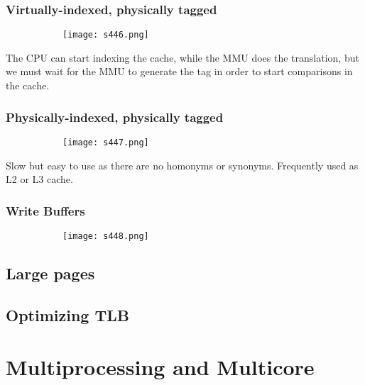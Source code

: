 \documentclass[8pt]{extreport}
\begin{document}
\subsection{Virtually-indexed, physically tagged}

\begin{figure}[H]
\begin{subfigure}[b]{0.4\linewidth}
\texttt{[image: s446.png]}
\end{subfigure}

\end{figure}
The CPU can start indexing the cache, while the MMU does the translation, but we must wait for the MMU to generate the tag in order to start comparisons in the cache.
\subsection{Physically-indexed, physically tagged}
\begin{figure}[H]
\begin{subfigure}[b]{0.4\linewidth}
\texttt{[image: s447.png]}
\end{subfigure}
\end{figure}
Slow but easy to use as there are no homonyms or synonyms.  Frequently used as L2 or L3 cache.


\subsection{Write Buffers}
 \begin{figure}[H]
\begin{subfigure}[b]{0.4\linewidth}
\texttt{[image: s448.png]}
\end{subfigure}
\end{figure}


\section{Large pages}

\section{Optimizing TLB}

\chapter{Multiprocessing and Multicore}
\end{document}
